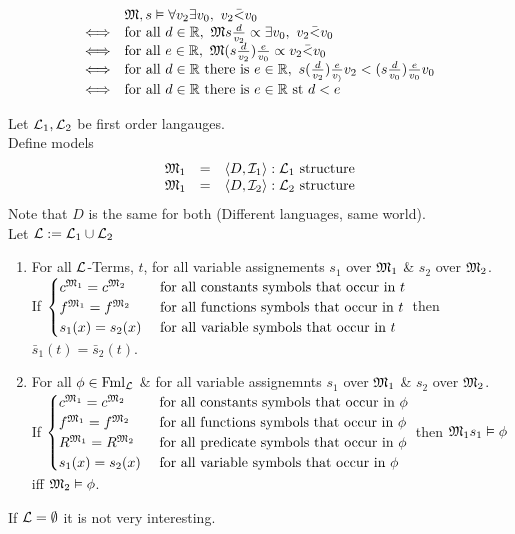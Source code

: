 \documentclass[11pt,a4paper]{article}
\begin{document}
\[\begin{array}{rl}
&\M,s\vDash\forall v_2\exists v_0,\ v_2\bar<v_0\\
\Longleftrightarrow&\text{for all }d\in\reals,\ \M s\frac{d}{v_2}\propto\exists v_0,\ v_2\bar<v_0\\
\Longleftrightarrow&\text{for all }e\in\reals,\ \M(s\frac{d}{v_2})\frac{e}{v_0}\propto v_2\bar<v_0\\
\Longleftrightarrow&\text{for all }d\in\reals\text{ there is }e\in\reals,\ s(\frac{d}{v_2})\frac{e}{v_)}v_2<(s\frac{d}{v_0})\frac{e}{v_0}v_0\\
\Longleftrightarrow&\text{for all }d\in\reals\text{ there is }e\in\reals\text{ st }d<e
\end{array}\]

\theorem{}
Let $\mathcal{L}_1,\mathcal{L}_2$ be first order langauges.\\
Define models
\[\begin{array}{rcl}
\mathfrak{M}_1&=&\langle D,\mathcal{I}_1\rangle:\mathcal{L}_1\text{ structure}\\
\mathfrak{M}_1&=&\langle D,\mathcal{I}_2\rangle:\mathcal{L}_2\text{ structure}
\end{array}\]
Note that $D$ is the same for both (\ie Different languages, same world).\\
Let $\mathcal{L}:=\mathcal{L}_1\cup\mathcal{L}_2$
\begin{enumerate}
	\item For all $\mathcal{L}$-Terms, $t$, for all variable assignements $s_1$ over $\mathfrak{M}_1$ \& $s_2$ over $\mathfrak{M}_2$.\\
	If $\begin{cases}c^{\mathfrak{M}_1}=c^{\mathfrak{M}_2}&\text{ for all constants symbols that occur in }t\\f^{\mathfrak{M}_1}=f^{\mathfrak{M}_2}&\text{ for all functions symbols that occur in }t\\s_1(x)=s_2(x)&\text{ for all variable symbols that occur in }t\end{cases}$ then $\bar{s}_1(t)=\bar{s}_2(t)$.
	\item For all $\phi\in\text{Fml}_{\mathcal{L}}$ \& for all variable assignemnts $s_1$ over $\mathfrak{M}_1$ \& $s_2$ over $\mathfrak{M}_2$.\\
	If $\begin{cases}c^{\mathfrak{M}_1}=c^{\mathfrak{M}_2}&\text{ for all constants symbols that occur in }\phi\\f^{\mathfrak{M}_1}=f^{\mathfrak{M}_2}&\text{ for all functions symbols that occur in }\phi\\R^{\mathfrak{M}_1}=R^{\mathfrak{M}_2}&\text{ for all predicate symbols that occur in }\phi\\s_1(x)=s_2(x)&\text{ for all variable symbols that occur in }\phi\end{cases}$ then $\mathfrak{M}_1s_1\vDash\phi$ iff $\mathfrak{M}_2\vDash\phi$.\\
\end{enumerate}
\nb If $\mathcal{L}=\emptyset$ it is not very interesting.\\
\end{document}
